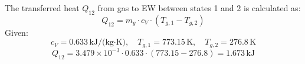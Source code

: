 The transferred heat \( Q_{12} \) from gas to EW between states 1 and 2 is calculated as:  
\[
Q_{12} = m_g \cdot c_V \cdot (T_{g,1} - T_{g,2})
\]  
Given:  
\[
c_V = 0.633 \, \text{kJ/(kg·K)}, \quad T_{g,1} = 773.15 \, \text{K}, \quad T_{g,2} = 276.8 \, \text{K}
\]  
\[
Q_{12} = 3.479 \times 10^{-3} \cdot 0.633 \cdot (773.15 - 276.8) = 1.673 \, \text{kJ}
\]